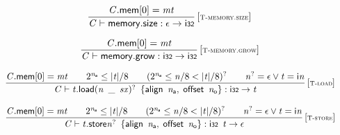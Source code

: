\vspace{1ex}

$$
\begin{array}{@{}c@{}}\displaystyle
\frac{
{\mathit{C}}.\mathsf{mem}{}[0] = {\mathit{mt}}
}{
{\mathit{C}} \vdash \mathsf{memory.size} : \epsilon \rightarrow \mathsf{i{\scriptstyle32}}
} \, {[\textsc{\scriptsize T{-}memory.size}]}
\qquad
\end{array}
$$

$$
\begin{array}{@{}c@{}}\displaystyle
\frac{
{\mathit{C}}.\mathsf{mem}{}[0] = {\mathit{mt}}
}{
{\mathit{C}} \vdash \mathsf{memory.grow} : \mathsf{i{\scriptstyle32}} \rightarrow \mathsf{i{\scriptstyle32}}
} \, {[\textsc{\scriptsize T{-}memory.grow}]}
\qquad
\end{array}
$$

$$
\begin{array}{@{}c@{}}\displaystyle
\frac{
{\mathit{C}}.\mathsf{mem}{}[0] = {\mathit{mt}}
 \qquad
{2^{{\mathit{n}}_{{\mathsf{a}}}}} \leq {|{\mathit{t}}|} / 8
 \qquad
({2^{{\mathit{n}}_{{\mathsf{a}}}}} \leq {\mathit{n}} / 8 < {|{\mathit{t}}|} / 8)^?
 \qquad
{{\mathit{n}}^?} = \epsilon \lor {\mathit{t}} = {\mathsf{i}}{{\mathit{n}}}
}{
{\mathit{C}} \vdash {{\mathit{t}}.\mathsf{load}}{{({\mathit{n}}~\,\mathsf{\_}~\,{\mathit{sx}})^?}}~\,\{ \begin{array}[t]{@{}l@{}}
\mathsf{align}~\,{\mathit{n}}_{{\mathsf{a}}},\; \mathsf{offset}~\,{\mathit{n}}_{{\mathsf{o}}} \}\end{array} : \mathsf{i{\scriptstyle32}} \rightarrow {\mathit{t}}
} \, {[\textsc{\scriptsize T{-}load}]}
\qquad
\end{array}
$$

$$
\begin{array}{@{}c@{}}\displaystyle
\frac{
{\mathit{C}}.\mathsf{mem}{}[0] = {\mathit{mt}}
 \qquad
{2^{{\mathit{n}}_{{\mathsf{a}}}}} \leq {|{\mathit{t}}|} / 8
 \qquad
({2^{{\mathit{n}}_{{\mathsf{a}}}}} \leq {\mathit{n}} / 8 < {|{\mathit{t}}|} / 8)^?
 \qquad
{{\mathit{n}}^?} = \epsilon \lor {\mathit{t}} = {\mathsf{i}}{{\mathit{n}}}
}{
{\mathit{C}} \vdash {{\mathit{t}}.\mathsf{store}}{{{\mathit{n}}^?}}~\,\{ \begin{array}[t]{@{}l@{}}
\mathsf{align}~\,{\mathit{n}}_{{\mathsf{a}}},\; \mathsf{offset}~\,{\mathit{n}}_{{\mathsf{o}}} \}\end{array} : \mathsf{i{\scriptstyle32}}~\,{\mathit{t}} \rightarrow \epsilon
} \, {[\textsc{\scriptsize T{-}store}]}
\qquad
\end{array}
$$

